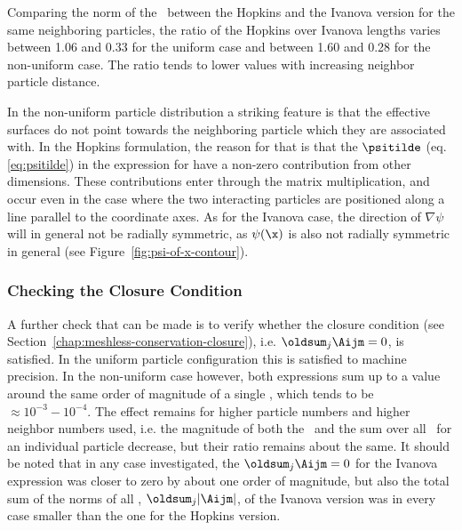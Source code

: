 Comparing the norm of the \Aij\ between the Hopkins and the Ivanova version for the same
neighboring particles, the ratio of the Hopkins over Ivanova lengths varies between 1.06 and 0.33
for the uniform case and between 1.60 and 0.28 for the non-uniform case.
The ratio tends to lower values with increasing neighbor particle distance.

In the non-uniform particle distribution a striking feature is that the effective surfaces do not
point towards the neighboring particle which they are associated with.
In the Hopkins formulation, the reason for that is that the $\psitilde$ (eq. \ref{eq:psitilde}) in
the expression for \Aij have a non-zero contribution from other dimensions. These contributions
enter through the matrix multiplication, and occur even in the case where the two interacting
particles are positioned along a line parallel to the coordinate axes.
As for the Ivanova case, the direction of $\nabla \psi$ will in general not be radially symmetric,
as $\psi(\x)$ is also not radially symmetric in general (see Figure~\ref{fig:psi-of-x-contour}).




\subsubsection{Checking the Closure Condition}

A further check that can be made is to verify whether the closure condition (see
Section~\ref{chap:meshless-conservation-closure}), i.e. $\oldsum_j \Aijm = 0$, is satisfied. In the
uniform particle configuration this is satisfied to machine precision. In the non-uniform case
however, both expressions sum up to a value around the same order of magnitude of a single \Aij,
which tends to be $\approx 10^{-3} - 10^{-4}$. The effect remains for higher particle numbers and
higher neighbor numbers used, i.e. the magnitude of both the \Aij\ and the sum over all \Aij\ for an
individual particle decrease, but their ratio remains about the same. It should be noted that in any
case investigated, the $\oldsum_j \Aijm = 0$ for the Ivanova expression was closer to zero by about
one order of magnitude, but also the total sum of the norms of all \Aij, $\oldsum_j |\Aijm|$, of the
Ivanova version was in every case smaller than the one for the Hopkins version.










